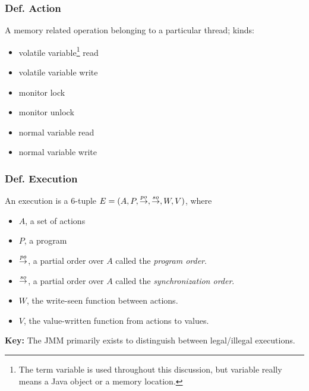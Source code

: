 \begin{frame}
    \frametitle{\textbf{Def.} Action}

    A memory related operation belonging to a particular thread; kinds:
    \begin{itemize}[itemsep=0.3em]
        \item volatile variable\footnote{The term variable is used throughout
              this discussion, but variable really means a Java object or
              a memory location.} read
        \item volatile variable write
        \item monitor lock
        \item monitor unlock
        \item normal variable read
        \item normal variable write
    \end{itemize}
\end{frame}

\begin{frame}
    \frametitle{\textbf{Def.} Execution}

    An execution is a 6-tuple $E = (A, P, \overset{po}{\rightarrow}, \overset{so}{\rightarrow}, W, V)$, where

    \begin{itemize}[itemsep=0.3em]
        \item $A$, a set of actions
        \item $P$, a program
        \item $\overset{po}{\rightarrow}$, a partial order over $A$ called the \textit{program order}.
        \item $\overset{so}{\rightarrow}$, a partial order over $A$ called the \textit{synchronization order}.
        \item $W$, the write-seen function between actions.
        \item $V$, the value-written function from actions to values.
    \end{itemize}

    \vspace{1.25em}

    \textbf{Key:} The JMM primarily exists to distinguish between legal/illegal
    executions.
\end{frame}

